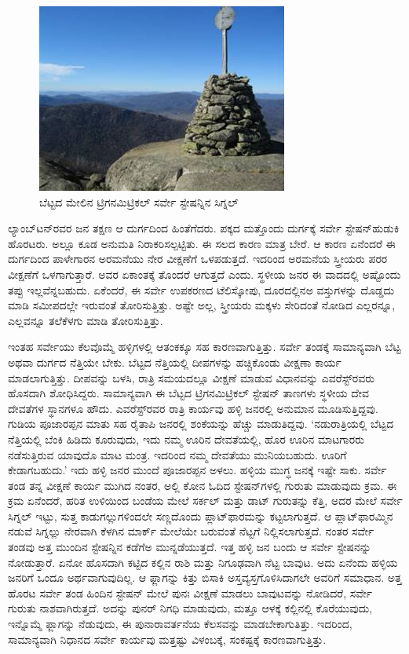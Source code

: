 \begin{figure}
\includegraphics[scale=0.6]{"images/image016.jpg"}
\caption{ಬೆಟ್ಟದ ಮೇಲಿನ ಟ್ರಿಗನಮಿಟ್ರಿಕಲ್​ ಸರ್ವೇ ಸ್ಟೇಷನ್ನಿನ ಸಿಗ್ನಲ್​}\label{chap12-fig2}
\end{figure}

ಲ್ಯಾಂಬ್​ಟನ್​ರವರ ಜನ ತಕ್ಷಣ ಆ ದುರ್ಗದಿಂದ ಹಿಂತೆಗೆದರು. ಪಕ್ಕದ ಮತ್ತೊಂದು ದುರ್ಗಕ್ಕೆ ಸರ್ವೇ ಸ್ಟೇಷನ್​ ಹುಡುಕಿ ಹೊರಟರು. ಅಲ್ಲೂ ಕೂಡ ಅನುಮತಿ ನಿರಾಕರಿಸಲ್ಪಟ್ಟಿತು. ಈ ಸಲದ ಕಾರಣ ಮಾತ್ರ ಬೇರೆ. ಆ ಕಾರಣ ಏನೆಂದರೆ ಈ ದುರ್ಗದಿಂದ ಪಾಳೇಗಾರನ ಅರಮನೆಯು ನೇರ ವೀಕ್ಷಣೆಗೆ ಒಳಪಡುತ್ತದೆ. ಇದರಿಂದ ಅರಮನೆಯ ಸ್ತ್ರೀಯರು ಪರರ ವೀಕ್ಷಣೆಗೆ ಒಳಗಾಗುತ್ತಾರೆ. ಅವರ ಏಕಾಂತಕ್ಕೆ ತೊಂದರೆ ಆಗುತ್ತದೆ ಎಂದು. ಸ್ಥಳೀಯ ಜನರ ಈ ವಾದದಲ್ಲಿ ಅಷ್ಟೊಂದು ತಪ್ಪು ಇಲ್ಲವೆನ್ನಬಹುದು. ಏಕೆಂದರೆ, ಈ ಸರ್ವೇ ಉಪಕರಣದ ಟೆಲಿಸ್ಕೋಪು, ದೂರದಲ್ಲಿನಅ ವಸ್ತುಗಳನ್ನು ದೊಡ್ಡದು ಮಾಡಿ ಸಮೀಪದಲ್ಲೇ ಇರುವಂತೆ ತೋರಿಸುತ್ತಿತ್ತು. ಅಷ್ಟೇ ಅಲ್ಲ, ಸ್ತ್ರೀಯರು ಮಕ್ಕಳು ಸೇರಿದಂತೆ ನೋಡಿದ ಎಲ್ಲರನ್ನೂ, ಎಲ್ಲವನ್ನೂ ತಲೆಕೆಳಗು ಮಾಡಿ ತೋರಿಸುತ್ತಿತ್ತು.

ಇಂತಹ ಸರ್ವೇಯು ಕೆಲವೊಮ್ಮೆ ಹಳ್ಳಿಗಳಲ್ಲಿ ಆತಂಕಕ್ಕೂ ಸಹ ಕಾರಣವಾಗುತ್ತಿತ್ತು. ಸರ್ವೇ ತಂಡಕ್ಕೆ ಸಾಮಾನ್ಯವಾಗಿ ಬೆಟ್ಟ ಅಥವಾ ದುರ್ಗದ ನೆತ್ತಿಯೇ ಬೇಕು. ಬೆಟ್ಟದ ನೆತ್ತಿಯಲ್ಲಿ ದೀಪಗಳನ್ನು ಹಚ್ಚಿಕೊಂಡು ವೀಕ್ಷಣಾ ಕಾರ್ಯ ಮಾಡಲಾಗುತ್ತಿತ್ತು. ದೀಪವನ್ನು ಬಳಸಿ, ರಾತ್ರಿ ಸಮಯದಲ್ಲೂ ವೀಕ್ಷಣೆ ಮಾಡುವ ವಿಧಾನವನ್ನು ಎವರೆಸ್ಟ್​ರವರು ಹೊಸದಾಗಿ ಶೋಧಿಸಿದ್ದರು. ಸಾಮಾನ್ಯವಾಗಿ ಈ ಬೆಟ್ಟದ ಟ್ರಿಗನಮಿಟ್ರಿಕಲ್​ ಸ್ಟೇಷನ್​ ತಾಣಗಳು ಸ್ಥಳೀಯ ದೇವ ದೇವತೆಗಳ ಸ್ಥಾನಗಳೂ ಹೌದು. ಎವರೆಸ್ಟ್​ರವರ ರಾತ್ರಿ ಕಾರ್ಯವು ಹಳ್ಳಿ ಜನರಲ್ಲಿ ಅನುಮಾನ ಮೂಡಿಸುತ್ತಿದ್ದವು. ಗುಡಿಯ ಪೂಜಾರಪ್ಪನ ಮಾತು ಸಹ ರೈತಾಪಿ ಜನರಲ್ಲಿ ಶಂಕೆಯನ್ನು ಹೆಚ್ಚು ಮಾಡುತಿದ್ದವು. ‘ನಡುರಾತ್ರಿಯಲ್ಲಿ ಬೆಟ್ಟದ ನೆತ್ತಿಯಲ್ಲಿ ಬೆಂಕಿ ಹಿಡಿದು ಕೂರುವುದು, ಇದು ನಮ್ಮ ಊರಿನ ದೇವತೆಯಲ್ಲಿ, ಹೊರ ಊರಿನ ಮಾಟಗಾರರು ನಡೆಸುತ್ತಿರುವ ಯಾವುದೊ ಮಾಟ ಮಂತ್ರ. ಇದರಿಂದ ನಮ್ಮ ದೇವತೆಯು ಮುನಿಯಬಹುದು. ಊರಿಗೆ ಕೇಡಾಗಬಹುದು.’ ಇದು ಹಳ್ಳಿ ಜನರ ಮುಂದೆ ಪೂಜಾರಪ್ಪನ ಅಳಲು. ಹಳ್ಳಿಯ ಮುಗ್ಧ ಜನಕ್ಕೆ ಇಷ್ಟೇ ಸಾಕು. ಸರ್ವೇ ತಂಡ ತನ್ನ ವೀಕ್ಷಣೆ ಕಾರ್ಯ ಮುಗಿದ ನಂತರ, ಅಲ್ಲಿ ಕೋನ ಓದಿದ ಸ್ಟೇಷನ್​ಗಳಲ್ಲಿ ಗುರುತು ಮಾಡುವುದು ಕ್ರಮ. ಈ ಕ್ರಮ ಏನೆಂದರೆ, ಹರಿತ ಉಳಿಯಿಂದ ಬಂಡೆಯ ಮೇಲೆ ಸರ್ಕಲ್​ ಮತ್ತು ಡಾಟ್​ ಗುರುತನ್ನು ಕೆತ್ತಿ, ಅದರ ಮೇಲೆ ಸರ್ವೇ ಸಿಗ್ನಲ್​ ಇಟ್ಟು, ಸುತ್ತ ಕಾಡುಗಲ್ಲುಗಳಿಂದಲೇ ಸಣ್ಣದೊಂದು ಪ್ಲಾಟ್​ಫಾರಮನ್ನು ಕಟ್ಟಲಾಗುತ್ತದೆ. ಆ ಪ್ಲಾಟ್​ಫಾರಮ್ಮಿನ ನಡುವೆ ಸಿಗ್ನಲ್ಲು ನೇರವಾಗಿ ಕೆಳಗಿನ ಮಾರ್ಕ್ ಮೇಲೆಯೇ ಬರುವಂತೆ ನೆಟ್ಟಗೆ ನಿಲ್ಲಿಸಲಾಗುತ್ತದೆ. ನಂತರ ಸರ್ವೇ ತಂಡವು ಅತ್ತ ಮುಂದಿನ ಸ್ಟೇಷನ್ನಿನ ಕಡೆಗೆಅ ಮುನ್ನಡೆಯುತ್ತದೆ. ಇತ್ತ ಹಳ್ಳಿ ಜನ ಬಂದು ಆ ಸರ್ವೇ ಸ್ಟೇಷನನ್ನು ನೋಡುತ್ತಾರೆ. ಏನೋ ಹೊಸದಾಗಿ ಕಟ್ಟಿದ ಕಲ್ಲಿನ ರಾಶಿ ಮತ್ತು ನಿಗೂಢವಾಗಿ ನೆಟ್ಟ ಬಾವುಟ. ಅದು ಏನೆಂದು ಹಳ್ಳಿಯ ಜನರಿಗೆ ಒಂದೂ ಅರ್ಥವಾಗುವುದಿಲ್ಲ. ಆ ಫ್ಲಾಗನ್ನು ಕಿತ್ತು ಬಿಸಾಕಿ ಅಸ್ತವ್ಯಸ್ತಗೊಳಿಸಿದಾಗಲೇ ಅವರಿಗೆ ಸಮಾಧಾನ. ಅತ್ತ ಹೊರಟ ಸರ್ವೇ ತಂಡ ಹಿಂದಿನ ಸ್ಟೇಷನ್​ ಮೇಲೆ ಪುನಃ ವೀಕ್ಷಣೆ ಮಾಡಲು ಬಾವುಟವನ್ನು ನೋಡಿದರೆ, ಸರ್ವೇ ಗುರುತು ನಾಶವಾಗಿರುತ್ತದೆ. ಅದನ್ನು ಪುನರ್​ ನಿಗಧಿ ಮಾಡುವುದು, ಮತ್ತೂ ಆಳಕ್ಕೆ ಕಲ್ಲಿನಲ್ಲಿ ಕೊರೆಯುವುದು, ಇನ್ನೊಮ್ಮೆ ಫ್ಲಾಗನ್ನು ನೆಡುವುದು, ಈ ಪುನಾರಾವರ್ತನೆಯ ಕೆಲಸವನ್ನು ಮಾಡಬೇಕಾಗುತಿತ್ತು. ಇದರಿಂದ, ಸಾಮಾನ್ಯವಾಗಿ ನಿಧಾನದ ಸರ್ವೇ ಕಾರ್ಯವು ಮತ್ತಷ್ಟು ವಿಳಂಬಕ್ಕೆ, ಸಂಕಷ್ಟಕ್ಕೆ ಕಾರಣವಾಗುತ್ತಿತ್ತು.

